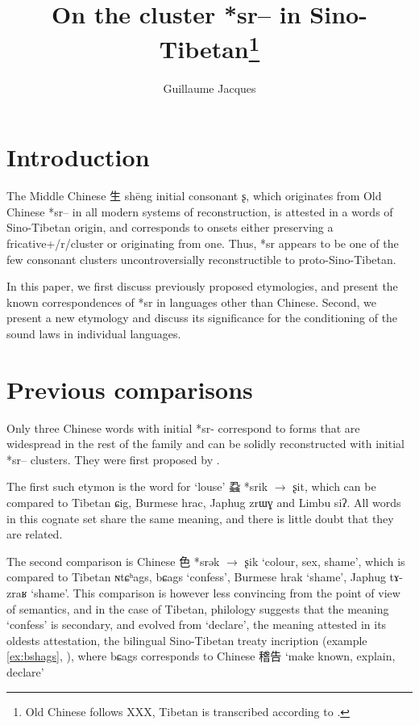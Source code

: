 \documentclass[oldfontcommands,oneside,a4paper,11pt]{article}
\newcommand{\ipa}[1]{{\phon #1}} %
\newcommand{\zh}[1]{{\cn #1}}
\begin{document}
 


\title{On the cluster *sr-- in Sino-Tibetan\footnote{Old Chinese follows XXX, Tibetan is transcribed according to \citet{jacques12transcription}.}}
\author{Guillaume Jacques}
\maketitle

\section{Introduction}

The Middle Chinese \zh{生} shēng initial consonant \ipa{ʂ}, which originates from Old Chinese *\ipa{sr--} in all modern systems of reconstruction, is attested in a words of Sino-Tibetan origin, and corresponds to onsets either preserving a fricative+/r/cluster or originating from one. Thus, *sr appears to be  one of the few consonant clusters uncontroversially reconstructible to proto-Sino-Tibetan. 

In this paper, we first discuss previously proposed etymologies, and present the known correspondences of *sr in languages other than Chinese. Second, we present a new etymology and discuss its significance for the conditioning of the sound laws in individual languages.

\section{Previous comparisons} \label{sec:previous}
Only three Chinese words with initial *\ipa{sr-} correspond to forms that are widespread in the rest of the family and can be solidly reconstructed with initial *\ipa{sr--} clusters.  They were first proposed by \citet{benedict72}.

The first such etymon is the word for `louse' \zh{蝨} *\ipa{srik} $\rightarrow$ \ipa{ʂit}, which can be compared to Tibetan \ipa{ɕig}, Burmese \ipa{hrac}, Japhug \ipa{zrɯɣ} and Limbu \ipa{siʔ}. All words in this cognate set share the same meaning, and there is little doubt that they are related.

The second comparison is Chinese \zh{色} *\ipa{srək} $\rightarrow$ \ipa{ʂik} `colour, sex, shame', which is compared to Tibetan \ipa{ɴtɕʰags}, \ipa{bɕags} `confess', Burmese \ipa{hrak} `shame', Japhug \ipa{tɤ-zraʁ} `shame'. This comparison is however less convincing from the point of view of semantics, and in the case of Tibetan, philology suggests that the meaning `confess' is secondary, and evolved from `declare', the meaning attested in its oldests attestation, the bilingual Sino-Tibetan treaty incription (example \ref{ex:bshags}, \citealt[40,80]{licoblin87}), where 	\ipa{bɕags} corresponds to Chinese \zh{稽告} `make known, explain, declare' 
\end{document}
